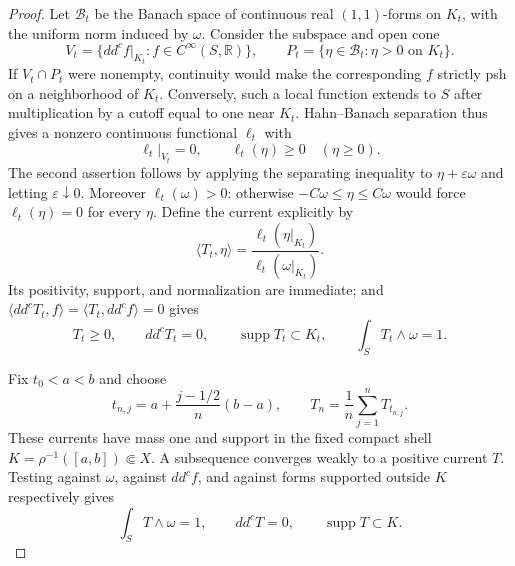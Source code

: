 \documentclass[11pt]{amsart}
\theoremstyle{definition}
\theoremstyle{remark}
\numberwithin{equation}{section}
\newcommand{\R}{\mathbb R}
\newcommand{\ddc}{dd^c}
\newcommand{\supp}{\operatorname{supp}}
\begin{document}
\begin{proof}
Let $\mathcal B_t$ be the Banach space of continuous real
$(1,1)$-forms on $K_t$, with the uniform norm induced by $\omega$.
Consider the subspace and open cone
\[
 V_t=\{\ddc f|_{K_t}:f\in C^\infty(S,\R)\},\qquad
 P_t=\{\eta\in\mathcal B_t:\eta>0\text{ on }K_t\}.
\]
If $V_t\cap P_t$ were nonempty, continuity would make the
corresponding $f$ strictly psh on a neighborhood of $K_t$.
Conversely, such a local function extends to $S$ after multiplication
by a cutoff equal to one near $K_t$. Hahn--Banach separation thus
gives a nonzero continuous functional $\ell_t$ with
\[
 \ell_t|_{V_t}=0,\qquad \ell_t(\eta)\ge0\quad(\eta\ge0).
\]
The second assertion follows by applying the separating inequality
to $\eta+\varepsilon\omega$ and letting $\varepsilon\downarrow0$.
Moreover $\ell_t(\omega)>0$: otherwise
$-C\omega\le\eta\le C\omega$ would force $\ell_t(\eta)=0$ for
every $\eta$. Define the current explicitly by
\[
 \langle T_t,\eta\rangle
   =\frac{\ell_t(\eta|_{K_t})}{\ell_t(\omega|_{K_t})}.
\]
Its positivity, support, and normalization are immediate; and
$\langle\ddc T_t,f\rangle=\langle T_t,\ddc f\rangle=0$ gives
\begin{equation}\label{eq:level-current}
 T_t\ge0,\qquad \ddc T_t=0,\qquad
 \supp T_t\subset K_t,\qquad \int_S T_t\wedge\omega=1.
\end{equation}

Fix $t_0<a<b$ and choose
\[
 t_{n,j}=a+\frac{j-1/2}{n}(b-a),\qquad
 T_n=\frac1n\sum_{j=1}^nT_{t_{n,j}}.
\]
These currents have mass one and support in the fixed compact shell
$K=\rho^{-1}([a,b])\Subset X$. A subsequence converges weakly to a
positive current $T$. Testing against $\omega$, against $\ddc f$,
and against forms supported outside $K$ respectively gives
\[
 \int_S T\wedge\omega=1,\qquad \ddc T=0,
 \qquad\supp T\subset K.
\]


\end{proof}
\end{document}
